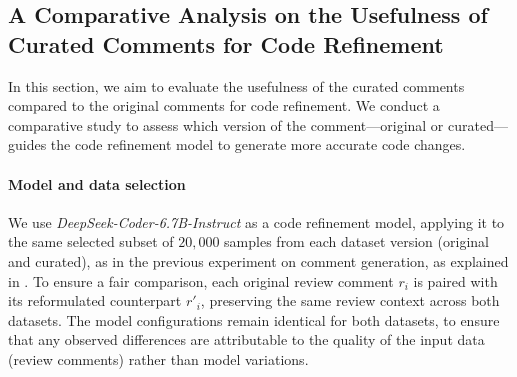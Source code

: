 \subsection{A Comparative Analysis on the Usefulness of Curated Comments for Code Refinement}

In this section, we aim to evaluate the usefulness of the curated comments compared to the original comments for code refinement.
We conduct a comparative study to assess which version of the comment—original or curated—guides the code refinement model to generate more accurate code changes.


\paragraph{\textbf{Model and data selection}}

We use \textit{DeepSeek-Coder-6.7B-Instruct} \cite{deepseek-coder} as a code refinement model, applying it to the same selected subset of $20,000$ samples from each dataset version (original and curated), as in the previous experiment on comment generation, as explained in . To ensure a fair comparison, each original review comment \( r_i \) is paired with its reformulated counterpart \( r'_i \), preserving the same review context across both datasets. The model configurations remain identical for both datasets, to ensure that any observed differences are attributable to the quality of the input data (\ie review comments) rather than model variations. 




